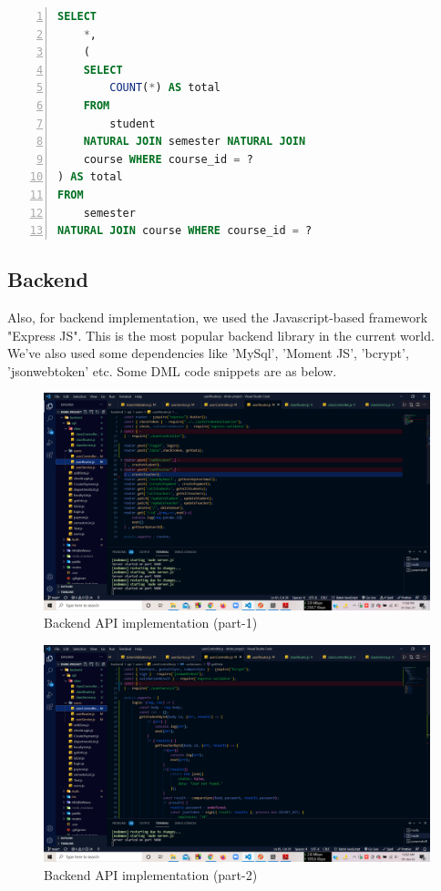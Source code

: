\begin{lstlisting}[caption={A SQL query to find course data}, label=list:sql, captionpos=b,
           backgroundcolor=\color{white},
           language=SQL,
           breaklines=true,
           frame=single,
           showspaces=false,
           basicstyle=\ttfamily,
           numbers=left,
           numberstyle=\tiny,
           rulecolor=\color{red},
           keywordstyle=\color{blue},
           commentstyle=\color{gray}
        ]
SELECT
    *,
    (
    SELECT
        COUNT(*) AS total
    FROM
        student
    NATURAL JOIN semester NATURAL JOIN 
    course WHERE course_id = ?
) AS total
FROM
    semester
NATURAL JOIN course WHERE course_id = ?
\end{lstlisting}
\subsection{Backend}\label{sub:backend}
Also, for backend implementation, we used the Javascript-based framework "Express JS". This is the most popular backend library in the current world. We've also used some dependencies like 'MySql', 'Moment JS', 'bcrypt', 'jsonwebtoken' etc. Some DML code snippets are as below.
\begin{figure}[H]
	\includegraphics[width=1\textwidth]{images/backend1}
	\caption{Backend API implementation (part-1)}
\end{figure}
\begin{figure}[H]
	\includegraphics[width=1\textwidth]{images/backend2}
	\caption{Backend API implementation (part-2)}
\end{figure}
\clearpage

